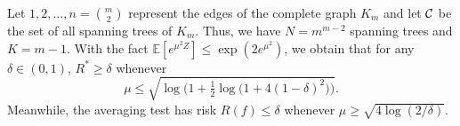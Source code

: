 \documentclass[10pt, oneside]{article}
\begin{document}
\begin{exmp}
  \label{exmp:Spanning Trees}
Let $1,2,\ldots,n={m\choose2}$ represent the edges of the complete graph $K_m$ and let ${\mathcal C}$ be the set of all spanning trees of $K_m$.
Thus, we have $N=m^{m-2}$ spanning trees and $K=m-1$. With the fact $\mathbb{E}[ e^{\mu^2 Z} ] \le \exp(2e^{\mu^2 })$, we obtain that for any $\delta\in(0,1)$,
$R^* \ge\delta$ whenever
\[
\mu\le\sqrt{\log\bigl(1+\tfrac1 2 \log\bigl(1+4(1-\delta)^2\bigr) \bigr)}.
\]
Meanwhile, the averaging test has risk $R(f) \le\delta$ whenever $\mu\ge\sqrt{4\log(2/\delta)}$.
\end{exmp}

\end{document}
